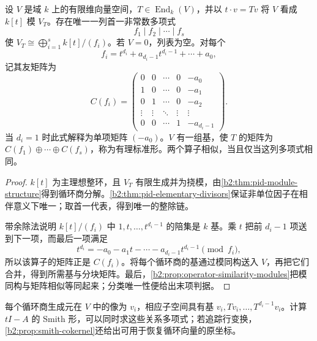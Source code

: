 \begin{theorem}[有理标准形]\label{b2:thm:rational-canonical-form}
	设 \(V\) 是域 \(k\) 上的有限维向量空间，\(T\in\operatorname{End}_k(V)\)，并以 \(t\cdot v=Tv\) 将 \(V\) 看成 \(k[t]\) 模 \(V_T\)。存在唯一一列首一非常数多项式
	\[
		f_1\mid f_2\mid\cdots\mid f_s
	\]
	使 \(V_T\cong\bigoplus_{i=1}^s k[t]/(f_i)\)。若 \(V=0\)，列表为空。对每个
	\[
		f_i=t^{d_i}+a_{d_i-1}t^{d_i-1}+\cdots+a_0,
	\]
	记其友矩阵为
	\[
		C(f_i)=\begin{pmatrix}
			0&0&\cdots&0&-a_0\\
			1&0&\cdots&0&-a_1\\
			0&1&\cdots&0&-a_2\\
			\vdots&\vdots&\ddots&\vdots&\vdots\\
			0&0&\cdots&1&-a_{d_i-1}
		\end{pmatrix}.
	\]
	当 \(d_i=1\) 时此式解释为单项矩阵 \((-a_0)\)。\(V\) 有一组基，使 \(T\) 的矩阵为 \(C(f_1)\oplus\cdots\oplus C(f_s)\)，称为有理标准形。两个算子相似，当且仅当这列多项式相同。
\end{theorem}
\begin{proof}
	\(k[t]\) 为主理想整环，且 \(V_T\) 有限生成并为挠模，由\cref{b2:thm:pid-module-structure}得到循环商分解。\cref{b2:thm:pid-elementary-divisors}保证非单位因子在相伴意义下唯一；取首一代表，得到唯一的整除链。

	带余除法说明 \(k[t]/(f_i)\) 中 \(1,t,\ldots,t^{d_i-1}\) 的陪集是 \(k\) 基。乘 \(t\) 把前 \(d_i-1\) 项送到下一项，而最后一项满足
	\[
		t^{d_i}=-a_0-a_1t-\cdots-a_{d_i-1}t^{d_i-1}\pmod{f_i},
	\]
	所以该算子的矩阵正是 \(C(f_i)\)。将每个循环商的基通过模同构送入 \(V\)，再把它们合并，得到所需基与分块矩阵。最后，\cref{b2:prop:operator-similarity-modules}把模同构与矩阵相似等同起来；分类唯一性便给出末项判据。
\end{proof}

每个循环商生成元在 \(V\) 中的像为 \(v_i\)，相应子空间具有基 \(v_i,Tv_i,\ldots,T^{d_i-1}v_i\)。计算 \(tI-A\) 的 Smith 形，可以同时求这些关系多项式；若追踪行变换，\cref{b2:prop:smith-cokernel}还给出可用于恢复循环向量的原坐标。

